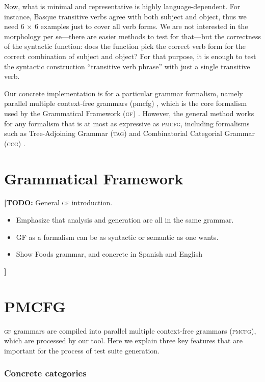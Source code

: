 \documentclass[runningheads]{llncs}
\def\gf{\textsc{gf}}
\def\ccg{\textsc{ccg}}
\def\tag{\textsc{tag}}
\def\pmcfg{\textsc{pmcfg}}
\newcommand{\todo}[1]{{\color{cyan}\textbf{[TODO: }#1\textbf{]}}}
\begin{document}
Now, what is minimal and representative is highly language-dependent. 
For instance, Basque transitive verbs agree with both subject and
object, thus we need 6 $\times$ 6 examples just to cover all verb
forms. We are not interested in the morphology per se---there are
easier methods to test for that---but the correctness of the syntactic
function: does the function pick the correct verb form for the correct
combination of subject and object? For that purpose, it is enough to
test the syntactic construction ``transitive verb phrase'' with just a
single transitive verb.

Our concrete implementation is for a particular grammar formalism,
namely parallel multiple context-free grammars ({\sc pmcfg})
\cite{seki91pmcfg}, which is the core formalism used by the
Grammatical Framework (\gf) \cite{ranta2004gf}. However, the general
method works for any formalism that is at most as expressive as
\pmcfg{}, including formalisms such as Tree-Adjoining Grammar (\tag)
\cite{joshi1975tag} and Combinatorial Categorial Grammar (\ccg)
\cite{steedman1988ccg}.

\section{Grammatical Framework}

\todo{General \gf{} introduction.

\begin{itemize}
\item Emphasize that analysis and generation are all in the same
  grammar.
\item GF as a formalism can be as syntactic or semantic as one wants.
\item Show Foods grammar, and concrete in Spanish and English
\end{itemize}}


\section{PMCFG}

\gf{} grammars are compiled into parallel multiple context-free
grammars (\pmcfg), which are processed by our tool. Here we explain
three key features that are important for the process of test suite
generation.

\subsubsection{Concrete categories}
\end{document}
